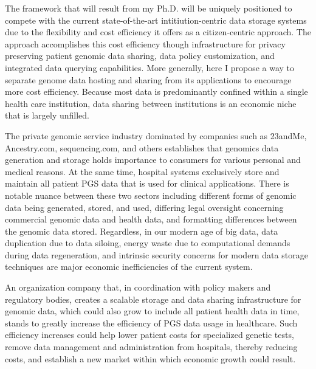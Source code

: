 \documentclass[a4paper,11pt]{article}
\begin{document}
\begin{refsection}
The framework that will result from my Ph.D. will be uniquely positioned to compete with the current state-of-the-art intitiution-centric data storage systems due to the flexibility and cost efficiency it offers as a citizen-centric approach.
The approach accomplishes this cost efficiency though infrastructure for privacy preserving patient genomic data sharing, data policy customization, and integrated data querying capabilities.
More generally, here I propose a way to separate genome data hosting and sharing from its applications to encourage more cost efficiency.
Because most data is predominantly confined within a single health care institution, data sharing between institutions is an economic niche that is largely unfilled. 

The private genomic service industry dominated by companies such as 23andMe, Ancestry.com, sequencing.com, and others establishes that genomics data generation and storage holds importance to consumers for various personal and medical reasons. 
At the same time, hospital systems exclusively store and maintain all patient PGS data that is used for clinical applications. 
There is notable nuance between these two sectors including different forms of genomic data being generated, stored, and used, differing legal oversight concerning commercial genomic data and health data, and formatting differences between the genomic data stored. 
Regardless, in our modern age of big data, data duplication due to data siloing, energy waste due to computational demands during data regeneration, and intrinsic security concerns for modern data storage techniques are major economic inefficiencies of the current system. 

An organization company that, in coordination with policy makers and regulatory bodies, creates a scalable storage and data sharing infrastructure for genomic data, which could also grow to include all patient health data in time, stands to greatly increase the efficiency of PGS data usage in healthcare. 
Such efficiency increases could help lower patient costs for specialized genetic tests, remove data management and administration from hospitals, thereby reducing costs, and establish a new market within which economic growth could result. 


\end{refsection}
\end{document}
